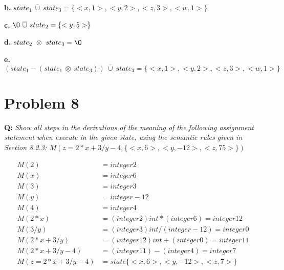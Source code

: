 \documentclass{article}
\begin{document}
\textbf{b.} $state_1\ \overline{\cup}\ state_3 = \{<x, 1>, <y, 2>, <z, 3>, <w, 1>\}$

\textbf{c.} $\O\ \overline{\cup}\ state_2 = \{<y, 5>\}$

\textbf{d.} $state_2\ \otimes\ state_3 = \O$

\textbf{e.} $(state_1 - (state_1\ \otimes\ state_3))\ \overline{\cup}\ state_3 = \{<x, 1>, <y, 2>, <z, 3>, <w, 1>\}$

\section*{Problem 8}
\textbf{Q:} \textit{Show all steps in the derivations of the meaning of the following assignment statement when execute in the given state, using the semantic rules given in Section 8.2.3: $M(z=2*x+3/y-4,\{<x,6>,<y,-12>,<z,75>\})$}

\begin{align*}
M(2) &= integer 2 \\
M(x) &= integer 6 \\
M(3) &= integer 3 \\
M(y) &= integer -12 \\
M(4) &= integer 4 \\
M(2 * x) &= (integer 2) int* (integer 6) = integer 12 \\
M(3 / y) &= (integer 3) int/ (integer -12) = integer 0 \\
M(2 * x + 3 / y) &= (integer 12) int+ (integer 0) = integer 11 \\
M(2 * x + 3 / y - 4) &= (integer 11) - (integer 4) = integer 7 \\
M(z = 2 * x + 3 / y - 4) &= state \{<x,6>,<y,-12>,<z,7>\}
\end{align*}
\end{document}
